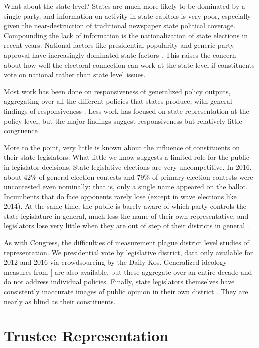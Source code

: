 \documentclass[
  oneside]{book}
\begin{document}
What about the state level? States are much more likely to be dominated by a single party, and information on activity in state capitols is very poor, especially given the near-destruction of traditional newspaper state political coverage. Compounding the lack of information is the nationalization of state elections in recent years. National factors like presidential popularity and generic party approval have increasingly dominated state factors \citep{Hopkins:2018}. This raises the concern about how well the electoral connection can work at the state level if constituents vote on national rather than state level issues.

Most work has been done on responsiveness of generalized policy outputs, aggregating over all the different policies that states produce, with general findings of responsiveness \citep{Erikson:1993, Caughey:2017}. Less work has focused on state representation at the policy level, but the major findings suggest responsiveness but relatively little congruence \citep{Lax:2009, Lax:2009b}.

More to the point, very little is known about the influence of constituents on their state legislators. What little we know suggests a limited role for the public in legislator decisions. State legislative elections are very uncompetitive. In 2016, about 42\% of general election contests and 79\% of primary election contests were uncontested even nominally: that is, only a single name appeared on the ballot. Incumbents that do face opponents rarely lose (except in wave elections like 2014). At the same time, the public is barely aware of which party controls the state legislature in general, much less the name of their own representative, and legislators lose very little when they are out of step of their districts in general \citep{Rogers:2017}.

As with Congress, the difficulties of measurement plague district level studies of representation. We presidential vote by legislative district, data only available for 2012 and 2016 via crowdsourcing by the Daily Kos. Generalized ideology measures from {[}\citet{Tausanovitch:2013} are also available, but these aggregate over an entire decade and do not address individual policies. Finally, state legislators themselves have consistently inaccurate images of public opinion in their own district \citep{Broockman:2017}. They are nearly as blind as their constituents.

\hypertarget{trustee-representation}{%
\section{Trustee Representation}\label{trustee-representation}}
\end{document}
